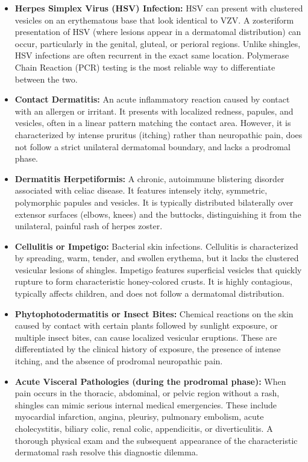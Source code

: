 \begin{itemize}
    \item \textbf{Herpes Simplex Virus (HSV) Infection:} HSV can present with clustered vesicles on an erythematous base that look identical to VZV. A zosteriform presentation of HSV (where lesions appear in a dermatomal distribution) can occur, particularly in the genital, gluteal, or perioral regions. Unlike shingles, HSV infections are often recurrent in the exact same location. Polymerase Chain Reaction (PCR) testing is the most reliable way to differentiate between the two.
    \item \textbf{Contact Dermatitis:} An acute inflammatory reaction caused by contact with an allergen or irritant. It presents with localized redness, papules, and vesicles, often in a linear pattern matching the contact area. However, it is characterized by intense pruritus (itching) rather than neuropathic pain, does not follow a strict unilateral dermatomal boundary, and lacks a prodromal phase.
    \item \textbf{Dermatitis Herpetiformis:} A chronic, autoimmune blistering disorder associated with celiac disease. It features intensely itchy, symmetric, polymorphic papules and vesicles. It is typically distributed bilaterally over extensor surfaces (elbows, knees) and the buttocks, distinguishing it from the unilateral, painful rash of herpes zoster.
    \item \textbf{Cellulitis or Impetigo:} Bacterial skin infections. Cellulitis is characterized by spreading, warm, tender, and swollen erythema, but it lacks the clustered vesicular lesions of shingles. Impetigo features superficial vesicles that quickly rupture to form characteristic honey-colored crusts. It is highly contagious, typically affects children, and does not follow a dermatomal distribution.
    \item \textbf{Phytophotodermatitis or Insect Bites:} Chemical reactions on the skin caused by contact with certain plants followed by sunlight exposure, or multiple insect bites, can cause localized vesicular eruptions. These are differentiated by the clinical history of exposure, the presence of intense itching, and the absence of prodromal neuropathic pain.
    \item \textbf{Acute Visceral Pathologies (during the prodromal phase):} When pain occurs in the thoracic, abdominal, or pelvic region without a rash, shingles can mimic serious internal medical emergencies. These include myocardial infarction, angina, pleurisy, pulmonary embolism, acute cholecystitis, biliary colic, renal colic, appendicitis, or diverticulitis. A thorough physical exam and the subsequent appearance of the characteristic dermatomal rash resolve this diagnostic dilemma.
\end{itemize}

